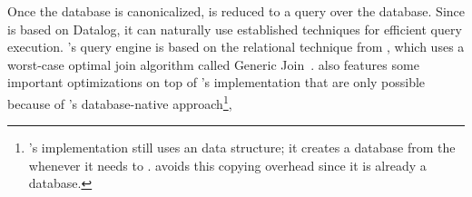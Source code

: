 Once the database is canonicalized,
 \ematching is reduced to a query over the database.
Since \egglog is based on Datalog, 
 it can naturally use established techniques for efficient query execution.
\Egglog's query engine is based on 
 the relational \ematching technique from \citet{relational-ematching},
 which uses a worst-case optimal join algorithm called Generic Join~\cite{generic-join}.
\Egglog also features
 some important optimizations on top of \citet{relational-ematching}'s
 implementation
 that are only possible because of \egglog's database-native approach\footnote{
    \citet{relational-ematching}'s implementation still uses an \egraph
    data structure; 
    it creates a database from the \egraph whenever it needs to \ematch.
    \Egglog avoids this copying overhead since it is already a database.
 }, 

